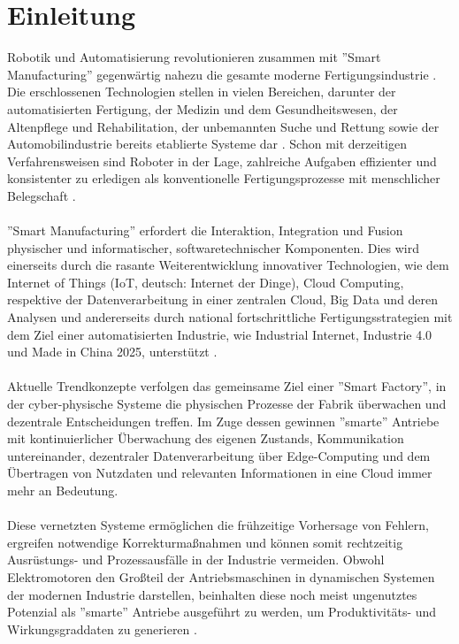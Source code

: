 \documentclass[Bachelor, BMR, ngerman]{twbook}
\begin{document}
\chapter{Einleitung} %

    Robotik und Automatisierung revolutionieren zusammen mit ''Smart Manufacturing'' gegenwärtig nahezu die gesamte moderne Fertigungsindustrie \cite{FrDe18,TaQi19}. Die erschlossenen Technologien stellen in vielen Bereichen, darunter der automatisierten Fertigung, der Medizin und dem Gesundheitswesen, der Altenpflege und Rehabilitation, der unbemannten Suche und Rettung sowie der Automobilindustrie bereits etablierte Systeme dar \cite{Eg14,SaDa18}. Schon mit derzeitigen Verfahrensweisen sind Roboter in der Lage, zahlreiche Aufgaben effizienter und konsistenter zu erledigen als konventionelle Fertigungsprozesse mit menschlicher Belegschaft \cite{FrDe18}.\\
    \\
    ''Smart Manufacturing'' erfordert die Interaktion, Integration und Fusion physischer und informatischer, softwaretechnischer Komponenten. Dies wird einerseits durch die rasante Weiterentwicklung innovativer Technologien, wie dem Internet of Things (IoT, deutsch: Internet der Dinge), Cloud Computing, respektive der Datenverarbeitung in einer zentralen Cloud, Big Data und deren Analysen und andererseits durch national fortschrittliche Fertigungsstrategien mit dem Ziel einer automatisierten Industrie, wie Industrial Internet, Industrie 4.0 und Made in China 2025, unterstützt \cite{TaQi19}.\\
    \\
    Aktuelle Trendkonzepte verfolgen das gemeinsame Ziel einer ''Smart Factory'', in der cyber-physische Systeme die physischen Prozesse der Fabrik überwachen und dezentrale Entscheidungen treffen. Im Zuge dessen gewinnen ''smarte'' Antriebe mit kontinuierlicher Überwachung des eigenen Zustands, Kommunikation untereinander, dezentraler Datenverarbeitung über Edge-Computing und dem Übertragen von Nutzdaten und relevanten Informationen in eine Cloud immer mehr an Bedeutung.\\
    \\
    Diese vernetzten Systeme ermöglichen die frühzeitige Vorhersage von Fehlern, ergreifen notwendige Korrekturmaßnahmen und können somit rechtzeitig Ausrüstungs- und Prozessausfälle in der Industrie vermeiden. Obwohl Elektromotoren den Großteil der Antriebsmaschinen in dynamischen Systemen der modernen Industrie darstellen, beinhalten diese noch meist ungenutztes Potenzial als ''smarte'' Antriebe ausgeführt zu werden, um Produktivitäts- und Wirkungsgraddaten zu generieren \cite{DoBh18}.
\end{document}
